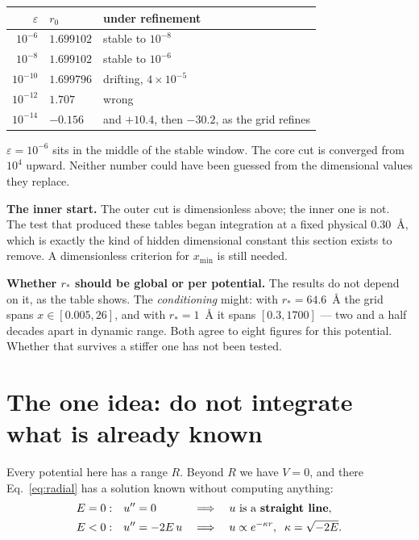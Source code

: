 \documentclass[11pt,a4paper]{article}
\begin{document}
\begin{center}
\small
\begin{tabular}{@{}rll@{}}
\toprule
$\varepsilon$ & $r_0$ & under refinement \\
\midrule
$10^{-6}$ & $1.699102$ & stable to $10^{-8}$ \\
$10^{-8}$ & $1.699102$ & stable to $10^{-6}$ \\
$10^{-10}$ & $1.699796$ & drifting, $4\times10^{-5}$ \\
$10^{-12}$ & $1.707$ & wrong \\
$10^{-14}$ & $-0.156$ & and $+10.4$, then $-30.2$, as the grid refines \\
\bottomrule
\end{tabular}
\end{center}

\noindent
$\varepsilon = 10^{-6}$ sits in the middle of the stable window. The core cut is
converged from $10^{4}$ upward. Neither number could have been guessed from the
dimensional values they replace.

\textbf{The inner start.} The outer cut is dimensionless above; the inner one
is not. The test that produced these tables began integration at a fixed
physical $0.30$~\AA, which is exactly the kind of hidden dimensional constant
this section exists to remove. A dimensionless criterion for $x_{\min}$ is
still needed.

\textbf{Whether $r_*$ should be global or per potential.} The results do not
depend on it, as the table shows. The \emph{conditioning} might: with
$r_* = 64.6$~\AA{} the grid spans $x \in [0.005, 26]$, and with $r_* = 1$~\AA{}
it spans $[0.3, 1700]$ --- two and a half decades apart in dynamic range. Both
agree to eight figures for this potential. Whether that survives a stiffer one
has not been tested.

\section{The one idea: do not integrate what is already known}
\label{sec:idea}

Every potential here has a range $R$. Beyond $R$ we have $V = 0$, and there
Eq.~\eqref{eq:radial} has a solution known without computing anything:
\begin{align}
  E = 0:&\quad u'' = 0 &&\Longrightarrow\quad u \text{ is a \textbf{straight line}},\\
  E < 0:&\quad u'' = -2E\,u &&\Longrightarrow\quad u \propto e^{-\kappa r},\;\;
    \kappa = \sqrt{-2E}.
\end{align}
\end{document}
